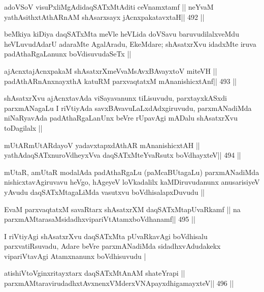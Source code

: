 \begin{shl}
adoVSoV visuPxliMgAdidaqSATxMtAditi ceVnamxtamf ||
neYvaM yathAsithxtAthARnAM shAsarxsayx jAcnxpakatavxtaH\hfill || 492 ||
\end{shl}

\begin{artha}
beMkiya kiDiya daqSATxMta meVle heVLida doVSavu baruvudilalxveMdu
heVLuvudAdarU adaraMte AgalAradu, EkeMdare; shAsatxrXvu idadxMte iruva
padAthaRgaLanunx boVdisuvudaSeTx ||
\end{artha}



\begin{shl}
ajAcnxtajAcnxpakaM shAsatxrXmeVvaMsAvxBAvayxtoV miteVH ||
padAthARnAnxnayxthA katuRM parxvaqtatxM mAnanishicxtAnf\hfill || 493 ||
\end{shl}

\begin{artha}
shAsatxrXvu ajAcnxtavAda viSayavanunx tiLisuvudu, parxtayxkASxdi
parxmANagaLu I riVtiyAda savxBAvavuLaLxdAdxgiruvudu, parxmANadiMda
niNaRyavAda padAthaRgaLanUnx beVre rUpavAgi mADalu shAsatxrXvu
toDagilalx ||
\end{artha}

\begin{shl}
mUtARmUtARdayoV yadavxtapxdAthAR mAnanishicxtAH ||
yathAdaqSATxnuroVdheyxVva daqSATxMteYvaRsutx boVdhayxteV\hfill || 494 ||
\end{shl}

\begin{artha}
mUtaR, amUtaR modalAda padAthaRgaLu (paMcaBUtagaLu) parxmANadiMda
nishicxtavAgiruvavu heVgo, hAgeyeV loVkadalilx kaMDiruvudanunx
anusarisiyeV yAvudu daqSATxMtagaLiMda vasutxvu boVdhisalapxDuvudu ||
\end{artha}

\begin{shl}
EvaM parxvaqtatxM savaRtarx shAsatxrXM daqSATxMtapUvaRkamf ||
na parxmAMtarasaMsidadhxvipariVtAtamxboVdhanamf\hfill || 495 ||
\end{shl}

\begin{artha}
I riVtiyAgi shAsatxrXvu daqSATxMta pUvaRkavAgi boVdhisalu
parxvatiRsuvadu, Adare beVre parxmANadiMda sidadhxvAdudakekx
vipariVtavAgi Atamxnanunx boVdhisuvudu |
\end{artha}

\begin{shl}
atishiVtoV\s ginxritayxtarx daqSATxMtAnAM shateYrapi ||
parxmAMtaravirudadhxtAvxnenxVMderxVNApayxdhigamayxteV\hfill || 496 ||
\end{shl}

